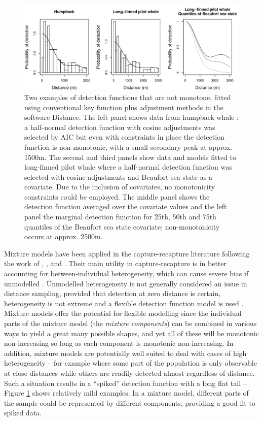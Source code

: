 \documentclass[useAMS,referee,usenatbib]{biom}
\begin{document}
\begin{figure}
\centering
\includegraphics[width=\textwidth]{figs/figure1.pdf}
\caption{Two examples of detection functions that are not monotone, fitted using conventional key function plus adjustment methods in the software Distance. The left panel shows data from humpback whale \citep{Williams:2007tc}: a half-normal detection function with cosine adjustments was selected by AIC but even with constraints in place the detection function is non-monotonic, with a small secondary peak at approx. 1500m. The second and third panels show data and models fitted to long-finned pilot whale \citep{Pike:2003ug} where a half-normal detection function was selected with cosine adjustments and Beaufort sea state as a covariate. Due to the inclusion of covariates, no monotonicity constraints could be employed.  The middle panel shows the detection function averaged over the covariate values and the left panel the marginal detection function for 25th, 50th and 75th quantiles of the Beaufort sea state covariate; non-monotonicity occurs at approx. 2500m.}
\label{fig1}
\end{figure}

Mixture models have been applied in the capture-recapture literature following the work of \cite{Pledger:2000tc}, \cite{Dorazio:2003uf}, \cite{Pledger:2005wy} and \cite{Morgan:2008wy}. Their main utility in capture-recapture is in better accounting for between-individual heterogeneity, which can cause severe bias if unmodelled \citep{Link:2003wo}. Unmodelled heterogeneity is not generally considered an issue in distance sampling, provided that detection at zero distance is certain, heterogeneity is not extreme and a flexible detection function model is used \citep[][Section 11.12]{Buckland:2004ts}. Mixture models offer the potential for flexible modelling since the individual parts of the mixture model (the \textit{mixture components}) can be combined in various ways to yield a great many possible shapes, and yet all of these will be monotonic non-increasing so long as each component is monotonic non-increasing. In addition, mixture models are potentially well suited to deal with cases of high heterogeneity -- for example where some part of the population  is only observable at close distances while others are readily detected almost regardless of distance. Such a situation results in a ``spiked'' detection function with a long flat tail -- Figure \ref{fig1} shows relatively mild examples. In a mixture model, different parts of the sample could be represented by different components, providing a good fit to spiked data. 
\end{document}
